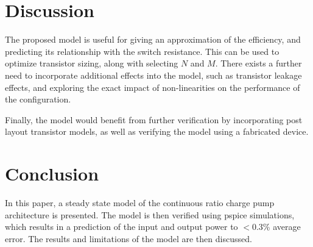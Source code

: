 \documentclass[conference]{IEEEtran}
\begin{document}
 	\section{Discussion}
 	The proposed model is useful for giving an approximation of the efficiency, and predicting its relationship with the switch resistance. This can be used to optimize transistor sizing, along with selecting $N$ and $M$. There exists a further need to incorporate additional effects into the model, such as transistor leakage effects, and exploring the exact impact of non-linearities on the performance of the configuration. 
 	
 	Finally, the model would benefit from further verification by incorporating post layout transistor models, as well as verifying the model using a fabricated device.
 	
 	\section{Conclusion}
 	In this paper, a steady state model of the continuous ratio charge pump architecture is presented. The model is then verified using pspice simulations, which results in a prediction of the input and output power to $<$0.3\% average error. The results and limitations of the model are then discussed.
 	
 	
 	
\end{document}
